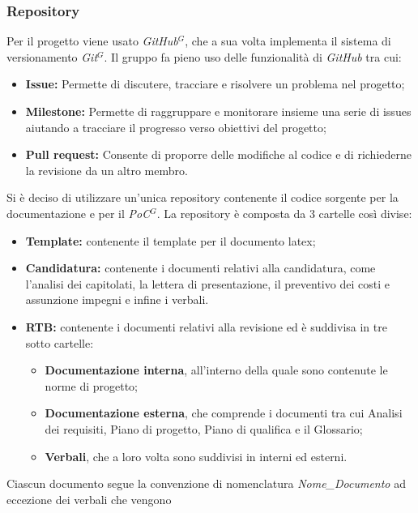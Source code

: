 \subsubsection{Repository}
    Per il progetto viene usato \emph{GitHub}$^{G}$, che a sua volta implementa il sistema di versionamento 
    \emph{Git}$^{G}$. Il gruppo fa pieno uso delle funzionalità di \emph{GitHub} tra cui:
    \begin{itemize}
        \item \textbf{Issue:} Permette di discutere, tracciare e risolvere un problema nel progetto;
        \item \textbf{Milestone:} Permette di raggruppare e monitorare insieme una serie di issues aiutando a tracciare il progresso verso obiettivi del progetto;
        \item \textbf{Pull request:} Consente di proporre delle modifiche al codice e di richiederne la revisione da un altro membro.
    \end{itemize}
    Si è deciso di utilizzare un'unica repository contenente il codice sorgente per la documentazione e per il \emph{PoC}$^{G}$.
    La repository è composta da 3 cartelle così divise:
    \begin{itemize}
        \item \textbf{Template:} contenente il template per il documento latex;
        \item \textbf{Candidatura:} contenente i documenti relativi alla candidatura, come l'analisi dei capitolati,
        la lettera di presentazione, il preventivo dei costi e assunzione impegni e infine i verbali.
        \item \textbf{RTB:} contenente i documenti relativi alla revisione ed è suddivisa in tre sotto cartelle:
        \begin{itemize}
            \item \textbf{Documentazione interna}, all'interno della quale sono contenute le norme di progetto;
            \item \textbf{Documentazione esterna}, che comprende i documenti tra cui Analisi dei requisiti, Piano di progetto, Piano di qualifica e il Glossario;
            \item \textbf{Verbali}, che a loro volta sono suddivisi in interni ed esterni.
        \end{itemize}
    \end{itemize}
    Ciascun documento segue la convenzione di nomenclatura \emph{Nome\_Documento} ad eccezione dei verbali che vengono 
